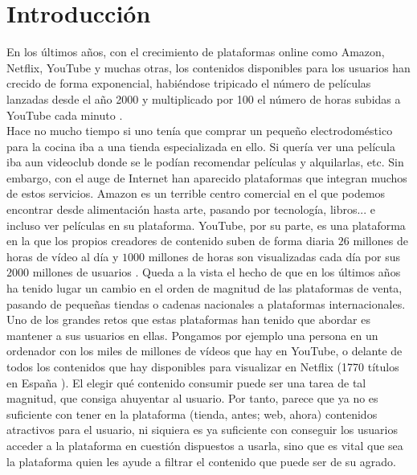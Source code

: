 \chapter{Introducción}\label{chap:introduccion}

En los últimos años, con el crecimiento de plataformas online como Amazon, Netflix, YouTube y muchas otras, los contenidos disponibles para los usuarios han crecido de forma exponencial, habiéndose tripicado el número de películas lanzadas desde el año 2000 \cite{watson_2020} y multiplicado por 100 el número de horas subidas a YouTube cada minuto \cite{clement_2019}. \\

Hace no mucho tiempo si uno tenía que comprar un pequeño electrodoméstico para la cocina iba a una tienda especializada en ello. Si quería ver una película iba aun videoclub donde se le podían recomendar películas y alquilarlas, etc. Sin embargo, con el auge de Internet han aparecido plataformas que integran muchos de estos servicios. Amazon es un terrible centro comercial en el que podemos encontrar desde alimentación hasta arte, pasando por tecnología, libros... e incluso ver películas en su plataforma. YouTube, por su parte, es una plataforma en la que los propios creadores de contenido suben de forma diaria $26$ millones de horas de vídeo al día y $1000$ millones de horas son visualizadas cada día por sus $2000$ millones de usuarios \cite{YoutubeStats}. Queda a la vista el hecho de que en los últimos años ha tenido lugar un cambio en el orden de magnitud de las plataformas de venta, pasando de pequeñas tiendas o cadenas nacionales a plataformas internacionales.\\

Uno de los grandes retos que estas plataformas han tenido que abordar es mantener a sus usuarios en ellas. Pongamos por ejemplo una persona en un ordenador con los miles de millones de vídeos que hay en YouTube, o delante de todos los contenidos que hay disponibles para visualizar en Netflix (1770 títulos en España \cite{Lovely2019}). El elegir qué contenido consumir puede ser una tarea de tal magnitud, que consiga ahuyentar al usuario. Por tanto, parece que ya no es suficiente con tener en la plataforma (tienda, antes; web, ahora) contenidos atractivos para el usuario, ni siquiera es ya suficiente con conseguir los usuarios acceder a la plataforma en cuestión dispuestos a usarla, sino que es vital que sea la plataforma quien les ayude a filtrar el contenido que puede ser de su agrado.\\


